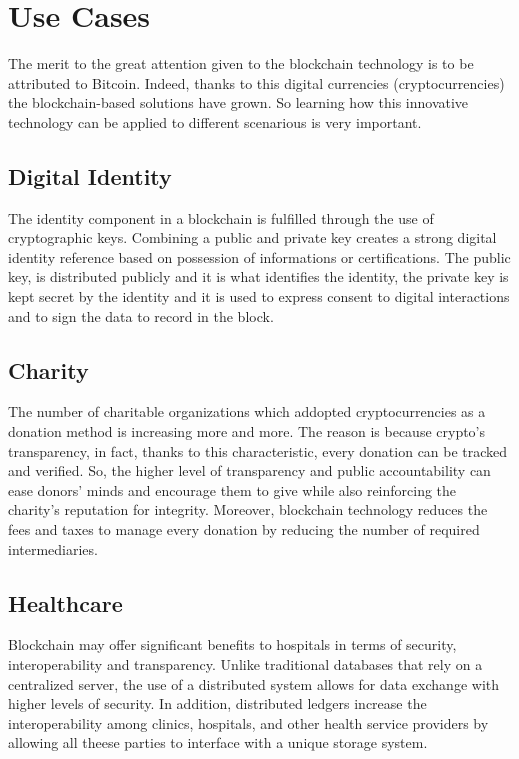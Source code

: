 \section{Use Cases}
\label{sec:usecases}

The merit to the great attention given to the blockchain technology is to be attributed
to Bitcoin. Indeed, thanks to this digital currencies (cryptocurrencies) the 
blockchain-based solutions have grown. So learning how this innovative technology
can be applied to different scenarious is very important. 

\subsection{Digital Identity}
\label{sec:identity}

The identity component in a blockchain is fulfilled through the use of cryptographic keys.
Combining a public and private key creates a strong digital identity reference based 
on possession of informations or certifications. The public key, is distributed 
publicly and it is what identifies the identity, the private key is kept secret by
the identity and it is used to express consent to digital interactions and to 
sign the data to record in the block.\cite{coindesk}

\subsection{Charity}
\label{sec:charity}

The number of charitable organizations which addopted cryptocurrencies as a donation
method is increasing more and more. The reason is because crypto's transparency,
in fact, thanks to this characteristic, every donation can be tracked and verified.
So, the higher level of transparency and public accountability can ease donors' minds 
and encourage them to give while also reinforcing the charity's reputation for integrity.
Moreover, blockchain technology reduces the fees and taxes to manage every donation by
reducing the number of required intermediaries.\cite{binancevision}

\subsection{Healthcare}
\label{sec:healthcare}

Blockchain may offer significant benefits to hospitals in terms of security, 
interoperability and transparency. Unlike traditional databases that rely on a centralized
server, the use of a distributed system allows for data exchange with higher levels of 
security. In addition, distributed ledgers increase the interoperability among clinics,
hospitals, and other health service providers by allowing all theese parties to interface
with a unique storage system.

